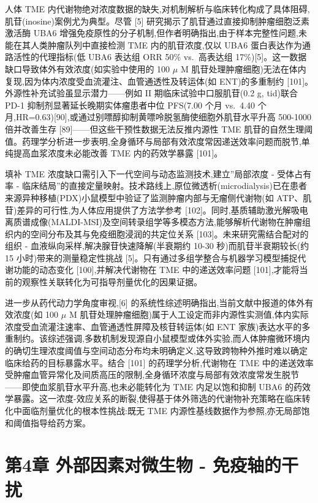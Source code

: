 \documentclass[11pt]{article}
\begin{document}
人体 TME 内代谢物绝对浓度数据的缺失,对机制解析与临床转化构成了具体阻碍,肌苷(inosine)案例尤为典型。尽管 {[}5{]} 研究揭示了肌苷通过直接抑制肿瘤细胞泛素激活酶 UBA6 增强免疫原性的分子机制,但作者明确指出,由于样本完整性问题,未能在其人类肿瘤队列中直接检测 TME 内的肌苷浓度,仅以 UBA6 蛋白表达作为通路活性的代理指标(低 UBA6 表达组 ORR 50\% vs.~高表达组 17\%){[}5{]}。这一数据缺口导致体外有效浓度(如实验中使用的 100 \(\mu\) M 肌苷处理肿瘤细胞)无法在体内复现,因为体内浓度受血流灌注、血管通透性及转运体(如 ENT)的多重制约 {[}101{]}。外源性补充试验虽显示潜力------例如 II 期临床试验中口服肌苷(0.2 g, tid)联合 PD-1 抑制剂显著延长晚期实体瘤患者中位 PFS(7.00 个月 vs.~4.40 个月,HR=0.63){[}90{]},或通过别嘌醇抑制黄嘌呤脱氢酶使细胞外肌苷水平升高 500-1000 倍并改善生存 {[}89{]}------但这些干预性数据无法反推内源性 TME 肌苷的自然生理阈值。药理学分析进一步表明,全身循环与局部有效浓度常因递送效率问题而脱节,单纯提高血浆浓度未必能改善 TME 内的药效学暴露 {[}101{]}。

填补 TME 浓度缺口需引入下一代空间与动态监测技术,建立''局部浓度 - 受体占有率 - 临床结局''的直接定量映射。技术路线上,原位微透析(microdialysis)已在患者来源异种移植(PDX)小鼠模型中验证了监测肿瘤内部与无瘤侧代谢物(如 ATP、肌苷)差异的可行性,为人体应用提供了方法学参考 {[}102{]}。同时,基质辅助激光解吸电离质谱成像(MALDI-MSI)及空间转录组学等多模态方法,能够解析代谢物在肿瘤组织内的空间分布及其与免疫细胞浸润的共定位关系 {[}103{]}。未来研究需结合配对的组织 - 血液纵向采样,解决腺苷快速降解(半衰期约 10-30 秒)而肌苷半衰期较长(约 15 小时)带来的测量稳定性挑战 {[}5{]}。只有通过多组学整合与机器学习模型捕捉代谢功能的动态变化 {[}100{]},并解决代谢物在 TME 中的递送效率问题 {[}101{]},才能将当前的观察性关联转化为可指导剂量优化的因果证据。

进一步从药代动力学角度审视,{[}6{]} 的系统性综述明确指出,当前文献中报道的体外有效浓度(如 100 \(\mu\) M 肌苷处理肿瘤细胞)属于人工设定而非内源性实测值,体内实际浓度受血流灌注速率、血管通透性屏障及核苷转运体(如 ENT 家族)表达水平的多重制约。该综述强调,多数机制发现源自小鼠模型或体外实验,而人体肿瘤微环境内的确切生理浓度阈值与空间动态分布均未明确定义,这导致跨物种外推时难以确定临床给药的目标暴露水平。结合 {[}101{]} 的药理学分析,代谢物在 TME 中的递送效率受肿瘤血管异常化及间质高压的限制,全身循环浓度与局部有效浓度常发生脱节------即使血浆肌苷水平升高,也未必能转化为 TME 内足以饱和抑制 UBA6 的药效学暴露。这一浓度-效应关系的断裂,使得基于体外筛选的代谢物补充策略在临床转化中面临剂量优化的根本性挑战:既无 TME 内源性基线数据作为参照,亦无局部饱和阈值指导给药方案。

\section{第4章 外部因素对微生物 - 免疫轴的干扰}\label{ux7b2c4ux7ae0-ux5916ux90e8ux56e0ux7d20ux5bf9ux5faeux751fux7269---ux514dux75abux8f74ux7684ux5e72ux6270}
\end{document}
